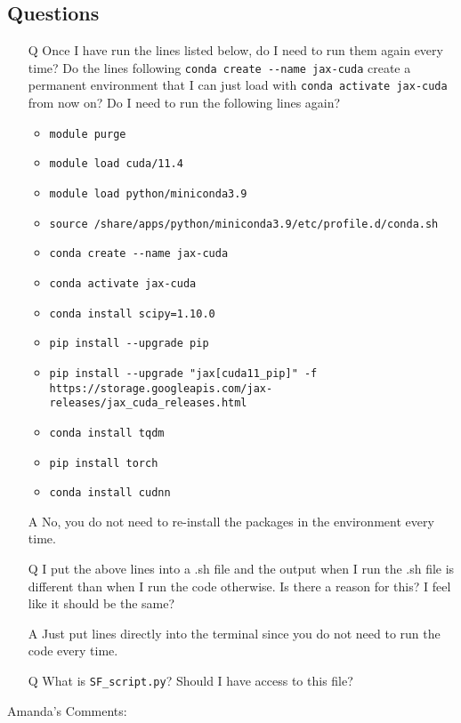 \documentclass{article}
\begin{document}
\subsection*{Questions}
\begin{itemize}
\item[Q] Once I have run the lines listed below, do I need to run them again every time? Do the lines following \verb|conda create --name jax-cuda| create a permanent environment that I can just load with \verb|conda activate jax-cuda| from now on? Do I need to run the following lines again?
\begin{itemize}
\item \verb|module purge|
\item \verb|module load cuda/11.4|
\item \verb|module load python/miniconda3.9|
\item \verb|source /share/apps/python/miniconda3.9/etc/profile.d/conda.sh|
\item \verb|conda create --name jax-cuda|
\item \verb|conda activate jax-cuda|
 
\item \verb|conda install scipy=1.10.0|
\item \verb|pip install --upgrade pip|
\item \verb|pip install --upgrade "jax[cuda11_pip]" -f https://storage.googleapis.com/jax-releases/jax_cuda_releases.html|
\item \verb|conda install tqdm|
\item \verb|pip install torch|
\item \verb|conda install cudnn|
\end{itemize}
\item[A] No, you do not need to re-install the packages in the environment every time.
\item[Q] I put the above lines into a .sh file and the output when I run the .sh file is different than when I run the code otherwise. Is there a reason for this? I feel like it should be the same?
\item[A] Just put lines directly into the terminal since you do not need to run the code every time.
\item[Q] What is \verb|SF_script.py|? Should I have access to this file?
\end{itemize}
Amanda's Comments:
\end{document}
